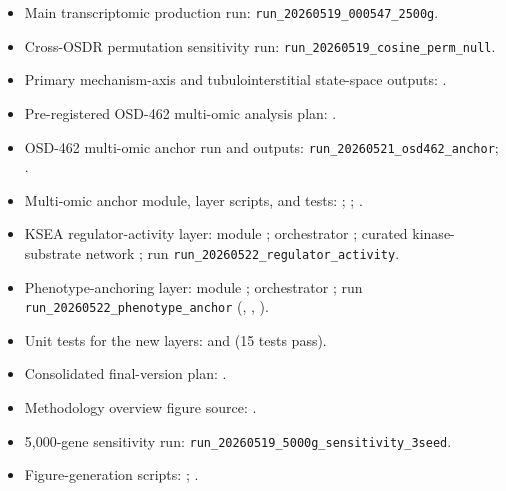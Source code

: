 \documentclass[11pt]{article}
\newcommand{\code}[1]{\texttt{#1}}
\begin{document}
\begin{itemize}
  \item Main transcriptomic production run: \code{run\_20260519\_000547\_2500g}.
  \item Cross-OSDR permutation sensitivity run: \code{run\_20260519\_cosine\_perm\_null}.
  \item Primary mechanism-axis and tubulointerstitial state-space outputs: .
  \item Pre-registered OSD-462 multi-omic analysis plan: .
  \item OSD-462 multi-omic anchor run and outputs: \code{run\_20260521\_osd462\_anchor}; .
  \item Multi-omic anchor module, layer scripts, and tests: ; ; .
  \item KSEA regulator-activity layer: module ; orchestrator ; curated kinase-substrate network ; run \code{run\_20260522\_regulator\_activity}.
  \item Phenotype-anchoring layer: module ; orchestrator ; run \code{run\_20260522\_phenotype\_anchor} (, , ).
  \item Unit tests for the new layers:  and  (15 tests pass).
  \item Consolidated final-version plan: .
  \item Methodology overview figure source: .
  \item 5,000-gene sensitivity run: \code{run\_20260519\_5000g\_sensitivity\_3seed}.
  \item Figure-generation scripts: ; .
\end{itemize}
\end{document}

